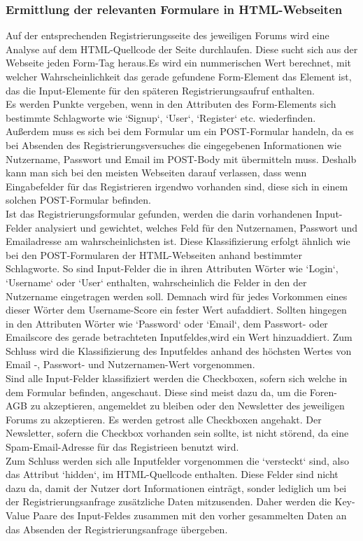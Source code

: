 \subsubsection{Ermittlung der relevanten Formulare in HTML-Webseiten}
Auf der entsprechenden Registrierungsseite des jeweiligen Forums wird eine Analyse auf dem HTML-Quellcode der Seite durchlaufen.
Diese sucht sich aus der Webseite jeden Form-Tag heraus.Es wird ein nummerischen Wert berechnet, mit welcher Wahrscheinlichkeit das gerade gefundene Form-Element das Element ist, das die Input-Elemente für den späteren Registrierungsaufruf enthalten. \\
Es werden Punkte vergeben, wenn in den Attributen des Form-Elements sich bestimmte Schlagworte wie `Signup`, `User`, `Register` etc. wiederfinden. Außerdem muss es sich bei dem Formular um ein POST-Formular handeln, da es bei Absenden des Registrierungsversuches die eingegebenen Informationen wie Nutzername, Passwort und Email im POST-Body mit übermitteln muss.
Deshalb kann man sich bei den meisten Webseiten darauf verlassen, dass wenn Eingabefelder für das Registrieren irgendwo vorhanden sind, diese sich in einem solchen POST-Formular befinden.\\
Ist das Registrierungsformular gefunden, werden die darin vorhandenen Input-Felder analysiert und gewichtet, welches Feld für den Nutzernamen, Passwort und Emailadresse am wahrscheinlichsten ist.
Diese Klassifizierung erfolgt ähnlich wie bei den POST-Formularen der HTML-Webseiten anhand bestimmter Schlagworte.
So sind Input-Felder die in ihren Attributen Wörter wie `Login`, `Username` oder `User` enthalten, wahrscheinlich die Felder in den der Nutzername eingetragen werden soll. Demnach wird für jedes Vorkommen eines dieser Wörter dem Username-Score ein fester Wert aufaddiert. Sollten hingegen in den Attributen Wörter wie `Password` oder `Email`, dem Passwort- oder Emailscore des gerade betrachteten Inputfeldes,wird ein Wert hinzuaddiert.
Zum Schluss wird die Klassifizierung des Inputfeldes anhand des höchsten Wertes von Email -, Passwort- und Nutzernamen-Wert vorgenommen. \\
Sind alle Input-Felder klassifiziert werden die Checkboxen, sofern sich welche in dem Formular befinden, angeschaut. Diese sind meist dazu da, um die Foren-AGB zu akzeptieren, angemeldet zu bleiben oder den Newsletter des jeweiligen Forums zu akzeptieren.
Es werden getrost alle Checkboxen angehakt. Der Newsletter, sofern die Checkbox vorhanden sein sollte, ist nicht störend, da eine Spam-Email-Adresse für das Registrieen benutzt wird.\\
Zum Schluss werden sich alle Inputfelder vorgenommen die `versteckt` sind, also das Attribut `hidden`, im HTML-Quellcode enthalten.
Diese Felder sind nicht dazu da, damit der Nutzer dort Informationen einträgt, sonder lediglich um bei der Registrierungsanfrage zusätzliche Daten mitzusenden. Daher werden die Key-Value Paare des Input-Feldes zusammen mit den vorher gesammelten Daten an das Absenden der Registrierungsanfrage übergeben.
